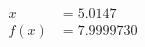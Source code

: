 \documentclass[preview]{standalone}
\begin{document}
\begin{align*}
x &= 5.0147\\f(x) &= 7.9999730
\end{align*}
\end{document}
